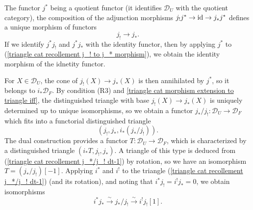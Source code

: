 The functor $j^*$ being a quotient functor (it identifies $\mathcal{D}_U$ with the quotient category), the composition of the adjunction morphisms $j_!j^*\to\operatorname{id}\to j_*j^*$ defines a unique morphism of functors
\begin{equation}\label{triangle cat recollement j_! to j_* morphism}
j_!\to j_*.
\end{equation}
If we identify $j^*j_!$ and $j^*j_*$ with the identity functor, then by applying $j^*$ to (\ref{triangle cat recollement j_! to j_* morphism}), we obtain the identity morphism of the idnetity functor.\par

For $X\in\mathcal{D}_U$, the cone of $j_!(X)\to j_*(X)$ is then annihilated by $j^*$, so it belongs to $i_*\mathcal{D}_F$. By condition (R3) and \cref{triangle cat morphism extension to triangle iff}, the distinguished triangle with base $j_!(X)\to j_*(X)$ is uniquely determined up to unique isomorphisms, so we obtain a functor $j_*/j_!:\mathcal{D}_U\to\mathcal{D}_F$ which fits into a functorial distinguished triangle
\begin{equation}\label{triangle cat recollement j_*/j_! dt-1}
(j_!,j_*,i_*(j_*/j_!)).
\end{equation}
The dual construction provides a functor $T:\mathcal{D}_U\to\mathcal{D}_F$, which is characterized by a distinguished triangle $(i_*T,j_!,j_*)$. A triangle of this type is deduced from (\ref{triangle cat recollement j_*/j_! dt-1}) by rotation, so we have an isomorphism $T=(j_*/j_!)[-1]$. Applying $i^*$ and $i^!$ to the triangle (\ref{triangle cat recollement j_*/j_! dt-1}) (and its rotation), and noting that $i^*j_!=i^!j_*=0$, we obtain isomorphisms
\begin{equation}\label{triangle cat recollement j_*/j_! isomorphic}
i^*j_*\stackrel{\sim}{\to} j_*/j_!\stackrel{\sim}{\to} i^!j_![1].
\end{equation}

